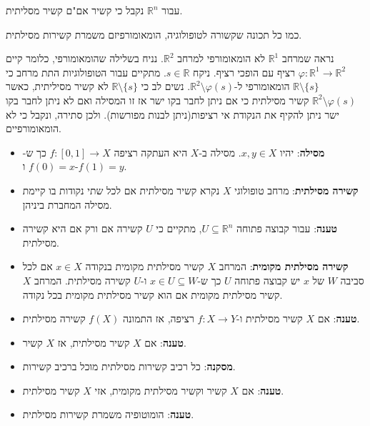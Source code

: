\documentclass{tstextbook}
\begin{document}
\begin{corollary}
עבור \(\mathbb{R}^{n}\) נקבל כי קשיר אם"ם קשיר מסליתית.

\end{corollary}
\begin{proposition}
כמו כל תכונה שקשורה לטופולוגיה, הומאומורפיזם משמרת קשירות מסילתית.

\end{proposition}
\begin{example}
נראה שמרחב \(\mathbb{R}^{1}\) לא הומאומורפי למרחב \(\mathbb{R}^{2}\). נניח בשלילה שהומאומורפי, כלומר קיים \(\varphi:\mathbb{R}^{1}\to \mathbb{R}^{2}\) רציף עם הופכי רציף.
ניקח \(s \in \mathbb{R}\). מתקיים עבור הטופולוגיות התת מרחב כי \(\mathbb{R}\setminus \{ s \}\) הומאומורפי ל-\(\mathbb{R}^{2}\setminus \varphi(s)\). נשים לב כי \(\mathbb{R}\setminus \{ s \}\) לא קשיר מסיליתית, כאשר \(\mathbb{R}^{2}\setminus \varphi(s)\) קשיר מסילתית כי אם ניתן לחבר בקו ישר אז זו המסילה ואם לא ניתן לחבר בקו ישר ניתן להקיף את הנקודת אי רציפות(ניתן לבנות מפורשות). ולכן סתירה, ונקבל כי לא הומאומורפיים.

\end{example}
\begin{summary}
  \begin{itemize}
    \item \textbf{מסילה}: יהיו \(x,y\in X\). מסילה ב-\(X\) היא העתקה רציפה \(f:[0,1]\to X\) כך ש-\(f(0)=x\) ו-\(f(1)=y\).
    \item \textbf{קשירה מסילתית}: מרחב טופולוגי \(X\) נקרא קשיר מסילתית אם לכל שתי נקודות בו קיימת מסילה המחברת ביניהן.
    \item \textbf{טענה}: עבור קבוצה פתוחה \(U\subseteq \mathbb{R}^{n}\), מתקיים כי \(U\) קשירה אם ורק אם היא קשירה מסילתית.
    \item \textbf{קשירה מסילתית מקומית}: המרחב \(X\) קשיר מסילתית מקומית בנקודה \(x \in X\) אם לכל סביבה \(W\) של \(x\) יש קבוצה פתוחה \(U\) כך ש-\(x \in U\subseteq W\) ו-\(U\) קשירה מסילתית. המרחב \(X\) קשיר מסילתית מקומית אם הוא קשיר מסילתית מקומית בכל נקודה.
    \item \textbf{טענה}: אם \(X\) קשיר מסילתית ו-\(f:X\to Y\) רציפה, אז התמונה \(f(X)\) קשירה מסילתית.
    \item \textbf{טענה}: אם \(X\) קשיר מסילתית, אז \(X\) קשיר.
    \item \textbf{מסקנה}: כל רכיב קשירות מסילתית מוכל ברכיב קשירות.
    \item \textbf{טענה}: אם \(X\) קשיר וקשיר מסילתית מקומית, אזי \(X\) קשיר מסילתית.
    \item \textbf{טענה}: הומוטופיה משמרת קשירות מסילתית.
  \end{itemize}
\end{summary}
\end{document}
